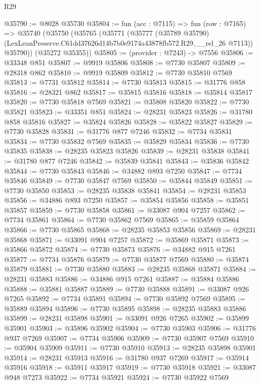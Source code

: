 \begin{lexlean}{R29}
\begin{coremodule}
@35790 := @8028 @35730
@35804 := fun (acc : @7115) =>
  fun (row : @7165) =>
  @35740
    (@35750
      (@35765
        (@35771
          (@35777
            (@35789 @35790)
            (LexLeanPreserve.C61dd37626d14b7b0e9174a43878fb572.R29.__rel_26 @7113))
          @35790))
      (@35272 @35355))
@35805 := (provider : @7243) -> @7556
@35806 := @33348 @851
@35807 := @9919 @35806
@35808 := @7730 @35807
@35809 := @28318 @862
@35810 := @9919 @35809
@35812 := @7730 @35810 @7569
@35813 := @7731 @35812
@35814 := @7730 @35813
@35815 := @31776 @858
@35816 := @28321 @862
@35817 := @35815 @35816
@35818 := @35814 @35817
@35820 := @7730 @35818 @7569
@35821 := @35808 @35820
@35822 := @7730 @35821
@35823 := @33351 @851
@35824 := @28231 @35823
@35826 := @31780 @858 @35816
@35827 := @35824 @35826
@35828 := @35822 @35827
@35829 := @7730 @35828
@35831 := @31776 @877 @7246
@35832 := @7734 @35831
@35834 := @7730 @35832 @7569
@35835 := @35829 @35834
@35836 := @7730 @35835
@35838 := @28235 @35823 @35826
@35839 := @28231 @35838
@35841 := @31780 @877 @7246
@35842 := @35839 @35841
@35843 := @35836 @35842
@35844 := @7730 @35843
@35846 := @34882 @893 @7250
@35847 := @7734 @35846
@35849 := @7730 @35847 @7569
@35850 := @35844 @35849
@35851 := @7730 @35850
@35853 := @28235 @35838 @35841
@35854 := @28231 @35853
@35856 := @34886 @893 @7250
@35857 := @35854 @35856
@35858 := @35851 @35857
@35859 := @7730 @35858
@35861 := @33087 @904 @7257
@35862 := @7734 @35861
@35864 := @7730 @35862 @7569
@35865 := @35859 @35864
@35866 := @7730 @35865
@35868 := @28235 @35853 @35856
@35869 := @28231 @35868
@35871 := @33091 @904 @7257
@35872 := @35869 @35871
@35873 := @35866 @35872
@35874 := @7730 @35873
@35876 := @34882 @915 @7261
@35877 := @7734 @35876
@35879 := @7730 @35877 @7569
@35880 := @35874 @35879
@35881 := @7730 @35880
@35883 := @28235 @35868 @35871
@35884 := @28231 @35883
@35886 := @34886 @915 @7261
@35887 := @35884 @35886
@35888 := @35881 @35887
@35889 := @7730 @35888
@35891 := @33087 @926 @7265
@35892 := @7734 @35891
@35894 := @7730 @35892 @7569
@35895 := @35889 @35894
@35896 := @7730 @35895
@35898 := @28235 @35883 @35886
@35899 := @28231 @35898
@35901 := @33091 @926 @7265
@35902 := @35899 @35901
@35903 := @35896 @35902
@35904 := @7730 @35903
@35906 := @31776 @937 @7269
@35907 := @7734 @35906
@35909 := @7730 @35907 @7569
@35910 := @35904 @35909
@35911 := @7730 @35910
@35913 := @28235 @35898 @35901
@35914 := @28231 @35913
@35916 := @31780 @937 @7269
@35917 := @35914 @35916
@35918 := @35911 @35917
@35919 := @7730 @35918
@35921 := @33087 @948 @7273
@35922 := @7734 @35921
@35924 := @7730 @35922 @7569

\end{coremodule}
\end{lexlean}
